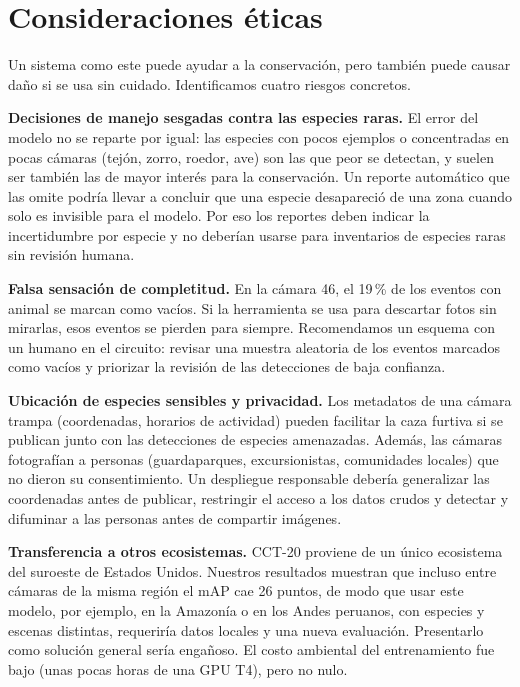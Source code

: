 \documentclass{article}
\begin{document}
\section{Consideraciones éticas}
\label{sec:etica}

Un sistema como este puede ayudar a la conservación, pero también puede causar
daño si se usa sin cuidado. Identificamos cuatro riesgos concretos.

\textbf{Decisiones de manejo sesgadas contra las especies raras.} El error del
modelo no se reparte por igual: las especies con pocos ejemplos o
concentradas en pocas cámaras (tejón, zorro, roedor, ave) son las que peor se
detectan, y suelen ser también las de mayor interés para la conservación. Un
reporte automático que las omite podría llevar a concluir que una especie
desapareció de una zona cuando solo es invisible para el modelo. Por eso los
reportes deben indicar la incertidumbre por especie y no deberían usarse para
inventarios de especies raras sin revisión humana.

\textbf{Falsa sensación de completitud.} En la cámara 46, el 19\,\% de los
eventos con animal se marcan como vacíos. Si la herramienta se usa para
descartar fotos sin mirarlas, esos eventos se pierden para siempre. Recomendamos
un esquema con un humano en el circuito: revisar una muestra aleatoria de los
eventos marcados como vacíos y priorizar la revisión de las detecciones de baja
confianza.

\textbf{Ubicación de especies sensibles y privacidad.} Los metadatos de una
cámara trampa (coordenadas, horarios de actividad) pueden facilitar la caza
furtiva si se publican junto con las detecciones de especies amenazadas. Además,
las cámaras fotografían a personas (guardaparques, excursionistas, comunidades
locales) que no dieron su consentimiento. Un despliegue responsable debería
generalizar las coordenadas antes de publicar, restringir el acceso a los
datos crudos y detectar y difuminar a las personas antes de compartir imágenes.

\textbf{Transferencia a otros ecosistemas.} CCT-20 proviene de un único
ecosistema del suroeste de Estados Unidos. Nuestros resultados muestran que
incluso entre cámaras de la misma región el mAP cae 26 puntos, de modo que
usar este modelo, por ejemplo, en la Amazonía o en los Andes peruanos, con
especies y escenas distintas, requeriría datos locales y una nueva evaluación.
Presentarlo como solución general sería engañoso. El costo ambiental del
entrenamiento fue bajo (unas pocas horas de una GPU T4), pero no nulo.
\end{document}
